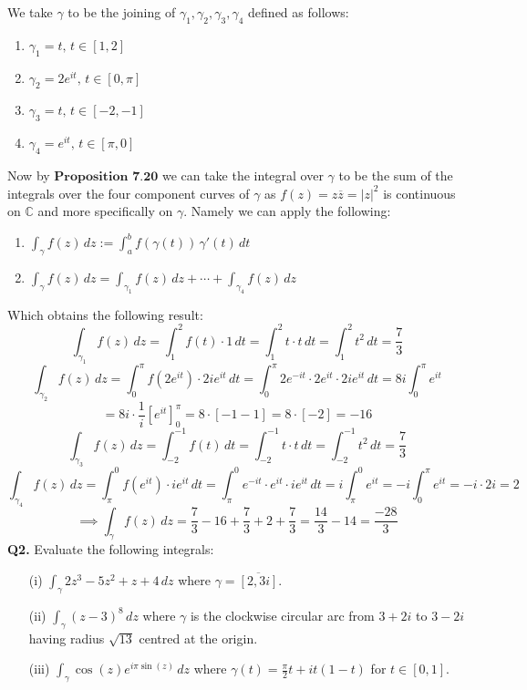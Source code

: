 \documentclass[12pt]{article}
\begin{document}
\newline
\linebreak
\noindent We take \(\gamma\) to be the joining of \(\gamma_1, \gamma_2, \gamma_3, \gamma_4\) defined as follows:
\begin{enumerate}
\item \(\gamma_1 = t, \, t \in \left[1,2\right]\) 
\item \(\gamma_2 = 2e^{it}, \, t \in \left[0, \pi\right]\) 
\item \(\gamma_3 = t, \, t \in \left[-2,-1\right]\) 
\item \(\gamma_4 = e^{it}, \, t \in \left[\pi, 0\right]\) 
\end{enumerate}
\vspace{0.1cm}
\noindent Now by \(\textbf{Proposition 7.20}\) we can take the integral over \(\gamma\) to be the sum of the integrals over the four component curves of \(\gamma\) as \(f(z) = z \overline{z} = \left|z\right|^2\) is continuous on \(\mathbb{C}\) and more specifically on \(\gamma\). \newline
\linebreak
\noindent Namely we can apply the following:
\begin{enumerate}
    \item \(\int_{\gamma} f(z) \, dz := \int_{a}^{b} f(\gamma(t)) \, \gamma'(t) \, dt \,\)
    \item \(\int_{\gamma} f(z) \, dz = \int_{\gamma_1} f(z) \, dz + \cdots + \int_{\gamma_4} f(z) \, dz\)
\end{enumerate}


\noindent Which obtains the following result:
\[
\int_{\gamma_1} f(z) \, dz = \int_{1}^{2} f(t) \cdot 1 \, dt =  \int_{1}^{2} t \cdot t \, dt =  \int_{1}^{2} t^2 \, dt = \frac{7}{3}
\]
\[
\int_{\gamma_2} f(z) \, dz = \int_{0}^{\pi} f(2e^{it})\cdot 2ie^{it} \, dt = \int_{0}^{\pi} 2e^{-it} \cdot 2e^{it }\cdot 2ie^{it} \, dt = 8i \int_{0}^{\pi} e^{it}
\]
\[
= 8i \cdot \frac{1}{i} \left[e^{it}\right]_{0}^{\pi} = 8 \cdot \left[-1 - 1\right] = 8 \cdot \left[-2\right] = -16
\]
\[
\int_{\gamma_3} f(z) \, dz = \int_{-2}^{-1} f(t) \, dt =  \int_{-2}^{-1} t \cdot t \, dt =  \int_{-2}^{-1} t^2 \, dt = \frac{7}{3}
\]
\[
\int_{\gamma_4} f(z) \, dz = \int_{\pi}^{0} f(e^{it})\cdot ie^{it} \, dt = \int_{\pi}^{0}e^{-it} \cdot e^{it}\cdot ie^{it} \, dt = i \int_{\pi}^{0} e^{it} = -i \int_{0}^{\pi} e^{it} = -i \cdot 2i = 2
\]
\[
\implies \int_{\gamma} f(z) \, dz = \frac{7}{3} -16 + \frac{7}{3} + 2 + \frac{7}{3} = \frac{14}{3} -14 = \frac{-28}{3}
\]
\[\]
\textbf{Q2.} Evaluate the following integrals:
\begin{itemize}
    \item[(i)] \(\int_{\gamma} 2z^3 - 5z^2 + z + 4 \, dz\) where \(\gamma = \overline{[2, 3i]}\).
    \item[(ii)] \(\int_{\gamma} (z - 3)^8 \, dz\) where \(\gamma\) is the clockwise circular arc from \(3 + 2i\) to \(3 - 2i\) having radius \(\sqrt{13}\) centred at the origin.
    \item[(iii)] \(\int_{\gamma} \cos(z) e^{i\pi \sin(z)} \, dz\) where \(\gamma(t) = \frac{\pi}{2} t + it(1 - t)\) for \(t \in [0, 1]\).
\end{itemize}
\end{document}
